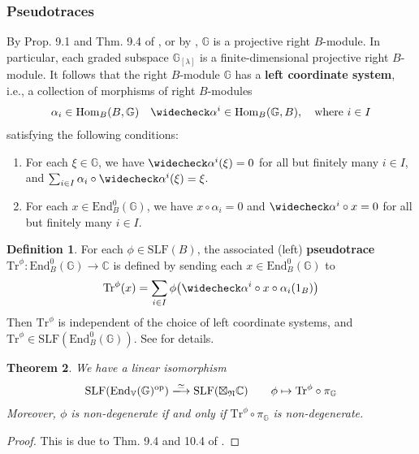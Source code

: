 \documentclass[11pt,b5paper,notitlepage]{article}
\theoremstyle{definition}
\newtheorem{df}{Definition}[section]
\theoremstyle{plain}
\newtheorem{thm}[df]{Theorem}
\newcommand{\wch}{\widecheck}
\newcommand{\Tr}{\mathrm{Tr}}
\newcommand{\End}{\mathrm{End}} %
\newcommand{\Hom}{\mathrm{Hom}}
\newcommand{\opp}{\mathrm{op}}
\newcommand{\SLF}{\mathrm{SLF}}
\newcommand{\Vbb}{\mathbb V}
\newcommand{\Gbb}{\mathbb G}
\newcommand{\Cbb}{\mathbb C}
\newcommand{\<}{\left\langle}
\renewcommand{\>}{\right\rangle}
\newcommand{\fn}{\mathfrak{N}}
\numberwithin{equation}{section}
\begin{document}
\subsubsection{Pseudotraces}
By Prop. 9.1 and Thm. 9.4 of \cite{GZ4}, or by \cite[Lem. 5.3]{GR-Verlinde}, $\Gbb$ is a projective right $B$-module. In particular, each graded subspace $\Gbb_{[\lambda]}$ is a finite-dimensional projective right $B$-module. It follows that the right $B$-module $\Gbb$ has a \textbf{left coordinate system}, i.e., a collection of morphisms of right $B$-modules
\begin{align}\label{eq98}
	\alpha_i\in \Hom_B(B,\Gbb)\quad \wch\alpha^i\in \Hom_B(\Gbb,B),\quad \text{where }i\in I
\end{align}
satisfying the following conditions:
\begin{enumerate}[label=(\alph*)]
\item  For each $\xi\in \Gbb$, we have $\wch\alpha^i(\xi)=0$ for all but finitely many $i\in I$, and  $\sum_{i\in I}\alpha_i\circ\wch\alpha^i(\xi)=\xi$.
\item For each $x\in \End_B^0(\Gbb)$, we have $x\circ\alpha_i=0$ and $\wch\alpha^i\circ x=0$ for all but finitely many $i\in I$.
\end{enumerate}


\begin{df}
For each $\phi\in\SLF(B)$, the associated (left) \textbf{pseudotrace} $\Tr^\phi:\End^0_B(\Gbb)\rightarrow\Cbb$ is defined by sending each $x\in\End^0_B(\Gbb)$ to
\begin{align}
\Tr^\phi(x)=\sum_{i\in I}\phi\big(\wch\alpha^i\circ x\circ\alpha_i(1_B)\big)
\end{align}
Then $\Tr^\phi$ is independent of the choice of left coordinate systems, and $\Tr^\phi\in\SLF(\End^0_B(\Gbb))$. See \cite[Sec. 4]{GZ4} for details.
\end{df}




\begin{thm}\label{lb70}
We have a linear isomorphism
\begin{align}\label{eq95}
\SLF(\End_\Vbb(\Gbb)^\opp)\xlongrightarrow{\simeq}\SLF(\boxtimes_\fn\Cbb)\qquad\phi\mapsto \Tr^\phi\circ\pi_\Gbb
\end{align}
Moreover, $\phi$ is non-degenerate if and only if $\Tr^\phi\circ\pi_\Gbb$ is non-degenerate.
\end{thm}

\begin{proof}
This is due to Thm. 9.4 and 10.4 of \cite{GZ4}.
\end{proof}
\end{document}
